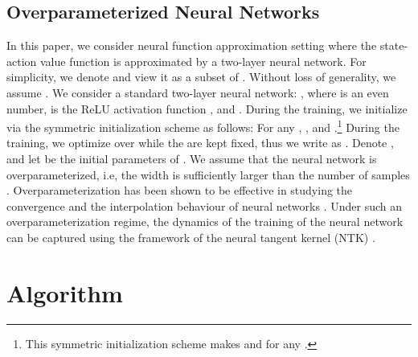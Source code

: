 \documentclass{article} \usepackage{iclr2023/iclr2023_conference,times}
\begin{document}
\vspace{-2pt}
\subsection{Overparameterized Neural Networks}
\label{subsetion: overparameterized nn}
In this paper, we consider neural function approximation setting where the state-action value function is approximated by a two-layer neural network. For simplicity, we denote  and view it as a subset of . Without loss of generality, we assume . We consider a standard two-layer neural network: ,  
where  is an even number,  is the ReLU activation function \citep{aroraunderstanding}, and . During the training, we initialize  via the symmetric initialization scheme \citep{gao2019convergence} as follows: For any , , and .\footnote{This symmetric initialization scheme makes  and  for any .}  
During the training, we optimize over  while the  are kept fixed, thus we write  as . Denote , and let  be the initial parameters of . We assume that the neural network is overparameterized, i.e, the width  is sufficiently larger than the number of samples . Overparameterization has been shown to be effective in studying the convergence and the interpolation behaviour of neural networks \citep{arora2019exact,allen2019convergence,hanin2019finite,cao2019generalization,belkin2021fit}. Under such an overparameterization regime, the dynamics of the training of the neural network can be captured using the framework of the neural tangent kernel (NTK) \citep{jacot2018neural}. 









 \section{Algorithm}
\end{document}
